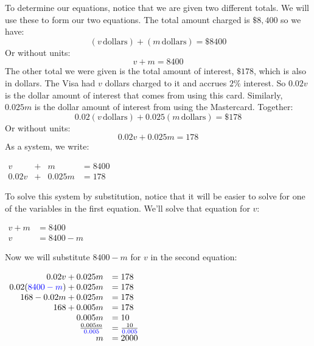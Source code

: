\documentclass[nooutcomes]{ximera}
\begin{document}
\begin{example}
\begin{explanation}
          To determine our equations, notice that we are given two different totals.
          We will use these to form our two equations.
          The total amount charged is $\$8{,}400$ so we have:
        \[ 
            (v\,\text{dollars})+(m\,\text{dollars})=\$8400
          \]
          Or without units:
          \[
            v+m=8400 
     \]
          The other total we were given is the total amount of interest,
          $\$178$, which is also in dollars.
          The Visa had $v$ dollars charged to it and accrues $2\%$ interest.
          So $0.02v$ is the dollar amount of interest that comes from using this card.
          Similarly, $0.025m$ is the dollar amount of interest from using the Mastercard.
          Together:
      \[
            0.02(v\,\text{dollars})+0.025(m\,\text{dollars})=\$178
         \]
          Or without units:
       \[
            0.02v+0.025m=178
  \]
          As a system, we write:
   \begin{center}
         $ 
            \begin{array}{cccc}
            v&+& m&=8400 \\
            0.02v&+& 0.025m&=178 
            \end{array}
$
\end{center}
          To solve this system by substitution,
          notice that it will be easier to solve for one of the variables in the first equation.
          We'll solve that equation for $v$:
\begin{center}
$
\begin{array}{rl}
            v+m&=8400\\
            v&=8400-m
\end{array}
$
\end{center}
          Now we will substitute $8400-m$ for $v$ in the second equation:
\begin{center}
$
          \begin{array}{rl}
            0.02v+0.025m&=178\\
            0.02({\color{blue}{{8400-m}}})+0.025m&=178\\
            168-0.02m+0.025m&=178\\
            168+0.005m&=178\\
            0.005m&=10\\
            \frac{0.005m}{{\color{blue}{{0.005}}}}&=\frac{10}{{\color{blue}{{0.005}}}}\\
            m&=2000
      \end{array}
$
\end{center}

\end{explanation}
\end{example}
\end{document}
